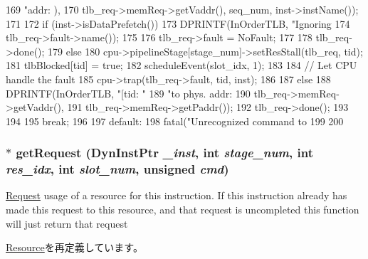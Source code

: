 \begin{DoxyCode}
{{{{169                         "addr:%
      ),
170                         tlb_req->memReq->getVaddr(), seq_num, inst->instName());
171 
172                 if (inst->isDataPrefetch()) {
173                     DPRINTF(InOrderTLB, "Ignoring %
174                             tlb_req->fault->name());
175 
176                     tlb_req->fault = NoFault;
177 
178                     tlb_req->done();
179                 } else {
180                     cpu->pipelineStage[stage_num]->setResStall(tlb_req, tid);
181                     tlbBlocked[tid] = true;
182                     scheduleEvent(slot_idx, 1);
183 
184                     // Let CPU handle the fault
185                     cpu->trap(tlb_req->fault, tid, inst);
186                 }
187             } else {
188                 DPRINTF(InOrderTLB, "[tid:%
       "
189                         "to phys. addr:%
190                         tlb_req->memReq->getVaddr(),
191                         tlb_req->memReq->getPaddr());
192                 tlb_req->done();
193             }
194         }
195         break;
196 
197       default:
198         fatal("Unrecognized command to %
199     }
200 }
\end{DoxyCode}
\hypertarget{classTLBUnit_a98b2e8ae07f180e62be1d03beae400f9}{
\subsubsection[{getRequest}]{ $\ast$ getRequest ({\bf DynInstPtr} {\em \_\-inst}, \/  int {\em stage\_\-num}, \/  int {\em res\_\-idx}, \/  int {\em slot\_\-num}, \/  unsigned {\em cmd})}}
\label{classTLBUnit_a98b2e8ae07f180e62be1d03beae400f9}
\hyperlink{classRequest}{Request} usage of a resource for this instruction. If this instruction already has made this request to this resource, and that request is uncompleted this function will just return that request 

\hyperlink{classResource_aae5ce84f94a1057d7f60172daf5d731d}{Resource}を再定義しています。


